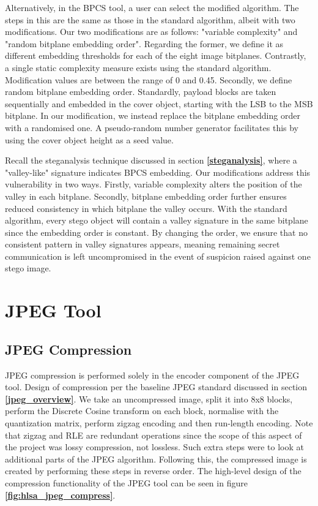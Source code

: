 \documentclass{l4proj}
\begin{document}
Alternatively, in the BPCS tool, a user can select the modified algorithm. The steps in this are the same as those in the standard algorithm, albeit with two modifications. Our two modifications are as follows: "variable complexity" and "random bitplane embedding order". Regarding the former, we define it as different embedding thresholds for each of the eight image bitplanes. Contrastly, a single static complexity measure exists using the standard algorithm. Modification values are between the range of 0 and 0.45. Secondly, we define random bitplane embedding order. Standardly, payload blocks are taken sequentially and embedded in the cover object, starting with the LSB to the MSB bitplane.  In our modification, we instead replace the bitplane embedding order with a randomised one. A pseudo-random number generator facilitates this by using the cover object height as a seed value.

Recall the steganalysis technique discussed in section \textbf{\ref{steganalysis}}, where a "valley-like" signature indicates BPCS embedding. Our modifications address this vulnerability in two ways. Firstly, variable complexity alters the position of the valley in each bitplane. Secondly, bitplane embedding order further ensures reduced consistency in which bitplane the valley occurs. With the standard algorithm, every stego object will contain a valley signature in the same bitplane since the embedding order is constant. By changing the order, we ensure that no consistent pattern in valley signatures appears, meaning remaining secret communication is left uncompromised in the event of suspicion raised against one stego image.

\section{JPEG Tool}\label{jpeg_design}

\subsection{JPEG Compression}

JPEG compression is performed solely in the encoder component of the JPEG tool. Design of compression per the baseline JPEG standard discussed in section \textbf{\ref{jpeg_overview}}. We take an uncompressed image, split it into 8x8 blocks, perform the Discrete Cosine transform on each block, normalise with the quantization matrix, perform zigzag encoding and then run-length encoding. Note that zigzag and RLE are redundant operations since the scope of this aspect of the project was lossy compression, not lossless. Such extra steps were to look at additional parts of the JPEG algorithm.  Following this, the compressed image is created by performing these steps in reverse order. The high-level design of the compression functionality of the JPEG tool can be seen in figure \textbf{\ref{fig:hlsa_jpeg_compress}}.
\end{document}
